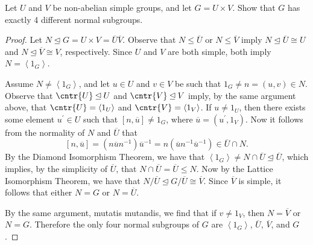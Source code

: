 \documentclass[10pt]{amsart}
\begin{document}
\begin{thm}
  Let $U$ and $V$ be non-abelian simple groups, and let $G = U \times V$.
  Show that $G$ has exactly 4 different normal subgroups.
  \begin{proof}
    Let $N \unlhd G = U \times V = \overline{U}\overline{V}$.
    Observe that $N \leq \overline{U}$ or $N \leq \overline{V}$ imply $N \unlhd \overline{U} \cong U$ and $N \unlhd \overline{V} \cong V$, respectively.
    Since $U$ and $V$ are both simple, both imply $N = \left< 1_G \right>$.

    Assume $N \not = \left< 1_G \right>$, and let $u \in U$ and $v \in V$ be such that $1_G \not = n = (u,v) \in N$.
    Observe that $\cntr{U} \unlhd U$ and $\cntr{V} \unlhd V$ imply, by the same argument above, that $\cntr{U} = \left< 1_U \right>$ and $\cntr{V} = \left< 1_V \right>$.
    If $u \not = 1_U$, then there exists some element $u^\prime \in U$ such that $[n,\overline{u}] \not = 1_G$, where $\overline{u} = (u^\prime, 1_V)$.
    Now it follows from the normality of $N$ and $\overline{U}$ that $$[n,\overline{u}] = (n\overline{u}n^{-1})\overline{u}^{-1} = n(\overline{u}n^{-1}\overline{u}^{-1}) \in \overline{U} \cap N.$$
    By the Diamond Isomorphism Theorem, we have that $\left<1_G\right> \not = N \cap \overline{U} \unlhd \overline{U}$, which implies, by the simplicity of $\overline{U}$, that $N \cap \overline{U} = \overline{U} \leq N$.
    Now by the Lattice Isomorphism Theorem, we have that $N/\overline{U} \unlhd G/\overline{U} \cong \overline{V}$.
    Since $\overline V$ is simple, it follows that either $N = G$ or $N = \overline{U}$.
    
    By the same argument, mutatis mutandis, we find that if $v \not = 1_V$, then $N = \overline{V}$ or $N = G$.
    Therefore the only four normal subgroups of $G$ are $\left<1_G\right>$, $\overline{U}$, $\overline{V}$, and $G$.
  \end{proof}
\end{thm}
\end{document}

